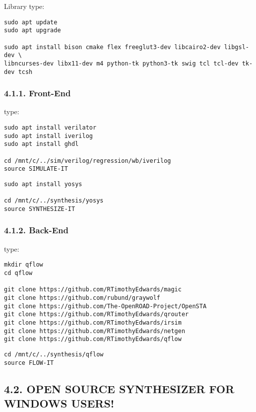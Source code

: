 \documentclass[]{article}
\begin{document}
Library type:

\begin{verbatim}
sudo apt update
sudo apt upgrade

sudo apt install bison cmake flex freeglut3-dev libcairo2-dev libgsl-dev \
libncurses-dev libx11-dev m4 python-tk python3-tk swig tcl tcl-dev tk-dev tcsh
\end{verbatim}

\subsubsection{4.1.1. Front-End}\label{front-end}

type:

\begin{verbatim}
sudo apt install verilator
sudo apt install iverilog
sudo apt install ghdl

cd /mnt/c/../sim/verilog/regression/wb/iverilog
source SIMULATE-IT
\end{verbatim}

\begin{verbatim}
sudo apt install yosys

cd /mnt/c/../synthesis/yosys
source SYNTHESIZE-IT
\end{verbatim}

\subsubsection{4.1.2. Back-End}\label{back-end}

type:

\begin{verbatim}
mkdir qflow
cd qflow

git clone https://github.com/RTimothyEdwards/magic
git clone https://github.com/rubund/graywolf
git clone https://github.com/The-OpenROAD-Project/OpenSTA
git clone https://github.com/RTimothyEdwards/qrouter
git clone https://github.com/RTimothyEdwards/irsim
git clone https://github.com/RTimothyEdwards/netgen
git clone https://github.com/RTimothyEdwards/qflow
\end{verbatim}

\begin{verbatim}
cd /mnt/c/../synthesis/qflow
source FLOW-IT
\end{verbatim}

\subsection{4.2. OPEN SOURCE SYNTHESIZER FOR WINDOWS
USERS!}\label{open-source-synthesizer-for-windows-users}
\end{document}
